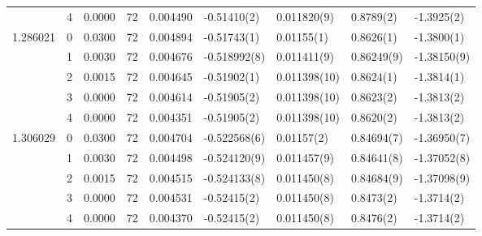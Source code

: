 \begin{tabular}{llrrrllll}
         & 4 &    0.0000 &     72 &  0.004490 &    -0.51410(2) &     0.011820(9) &      0.8789(2) &     -1.3925(2) \\
1.286021 & 0 &    0.0300 &     72 &  0.004894 &    -0.51743(1) &      0.01155(1) &      0.8626(1) &     -1.3800(1) \\
         & 1 &    0.0030 &     72 &  0.004676 &   -0.518992(8) &     0.011411(9) &     0.86249(9) &    -1.38150(9) \\
         & 2 &    0.0015 &     72 &  0.004645 &    -0.51902(1) &    0.011398(10) &      0.8624(1) &     -1.3814(1) \\
         & 3 &    0.0000 &     72 &  0.004614 &    -0.51905(2) &    0.011398(10) &      0.8623(2) &     -1.3813(2) \\
         & 4 &    0.0000 &     72 &  0.004351 &    -0.51905(2) &    0.011398(10) &      0.8620(2) &     -1.3813(2) \\
1.306029 & 0 &    0.0300 &     72 &  0.004704 &   -0.522568(6) &      0.01157(2) &     0.84694(7) &    -1.36950(7) \\
         & 1 &    0.0030 &     72 &  0.004498 &   -0.524120(9) &     0.011457(9) &     0.84641(8) &    -1.37052(8) \\
         & 2 &    0.0015 &     72 &  0.004515 &   -0.524133(8) &     0.011450(8) &     0.84684(9) &    -1.37098(9) \\
         & 3 &    0.0000 &     72 &  0.004531 &    -0.52415(2) &     0.011450(8) &      0.8473(2) &     -1.3714(2) \\
         & 4 &    0.0000 &     72 &  0.004370 &    -0.52415(2) &     0.011450(8) &      0.8476(2) &     -1.3714(2) \\
\bottomrule
\end{tabular}
